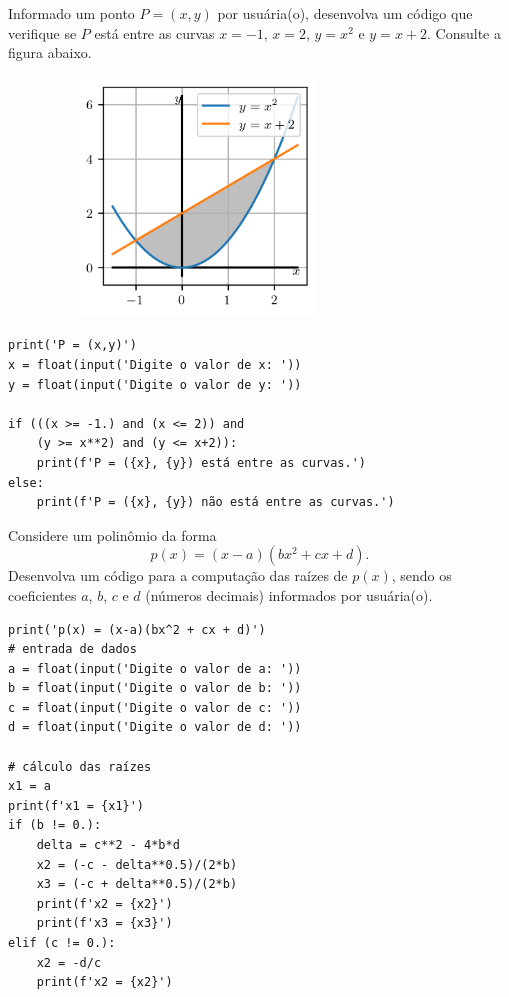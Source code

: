 \begin{exer}\label{cap_progest_sec_ramifica:exer:entre_curvas}
  Informado um ponto $P = (x, y)$ por usuária(o), desenvolva um código que verifique se $P$ está entre as curvas $x = -1$, $x = 2$, $y = x^2$ e $y = x+2$. Consulte a figura abaixo.
\begin{figure}[H]
  \centering
  \includegraphics[max width=0.7\textwidth, height=2.5in]{./cap_progest/dados/fig_exer_entre_curvas/fig.png}
\end{figure}
\end{exer}
\begin{resp}

\begin{lstlisting}
print('P = (x,y)')
x = float(input('Digite o valor de x: '))
y = float(input('Digite o valor de y: '))

if (((x >= -1.) and (x <= 2)) and
    (y >= x**2) and (y <= x+2)):
    print(f'P = ({x}, {y}) está entre as curvas.')
else:
    print(f'P = ({x}, {y}) não está entre as curvas.')
\end{lstlisting}

\end{resp}

\begin{exer}
  Considere um polinômio da forma
  \begin{equation}
    p(x) = (x-a)(bx^2 + cx + d).
  \end{equation}
  Desenvolva um código para a computação das raízes de $p(x)$, sendo os coeficientes $a$, $b$, $c$ e $d$ (números decimais) informados por usuária(o).
\end{exer}
\begin{resp}

\begin{lstlisting}
print('p(x) = (x-a)(bx^2 + cx + d)')
# entrada de dados
a = float(input('Digite o valor de a: '))
b = float(input('Digite o valor de b: '))
c = float(input('Digite o valor de c: '))
d = float(input('Digite o valor de d: '))

# cálculo das raízes
x1 = a
print(f'x1 = {x1}')
if (b != 0.):
    delta = c**2 - 4*b*d
    x2 = (-c - delta**0.5)/(2*b)
    x3 = (-c + delta**0.5)/(2*b)
    print(f'x2 = {x2}')
    print(f'x3 = {x3}')
elif (c != 0.):
    x2 = -d/c
    print(f'x2 = {x2}')
\end{lstlisting}

\end{resp}


